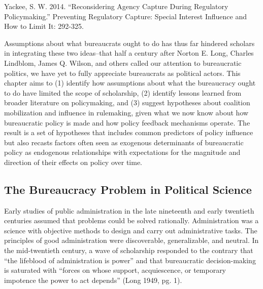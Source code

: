 Yackee, S. W.  2014.  ``Reconsidering Agency Capture During Regulatory Policymaking.''  Preventing Regulatory Capture: Special Interest Influence and How to Limit It: 292-325.









Assumptions about what bureaucrats ought to do has thus far hindered scholars in integrating these two ideas--that half a century after Norton E. Long, Charles Lindblom, James Q. Wilson, and others called our attention to bureaucratic politics, we have yet to fully appreciate bureaucrats as political actors. This chapter aims to (1) identify how assumptions about what the bureaucracy ought to do have limited the scope of scholarship, (2) identify lessons learned from broader literature on policymaking, and (3) suggest hypotheses about coalition mobilization and influence in rulemaking, given what we now know about how bureaucratic policy is made and how policy feedback mechanisms operate. %
The result is a set of hypotheses that includes common predictors of policy influence but also recasts factors often seen as exogenous determinants of bureaucratic policy as endogenous relationships with expectations for the magnitude and direction of their effects on policy over time. 



\subsection{The Bureaucracy Problem in Political Science}

Early studies of public administration in the late nineteenth and early twentieth centuries assumed that problems could be solved rationally. Administration was a science with objective methods to design and carry out administrative tasks. The principles of good administration were discoverable, generalizable, and neutral. In the mid-twentieth century, a wave of scholarship responded to the contrary that ``the lifeblood of administration is power'' and that bureaucratic decision-making is saturated with ``forces on whose support, acquiescence, or temporary impotence the power to act depends'' (Long 1949, pg. 1). 


